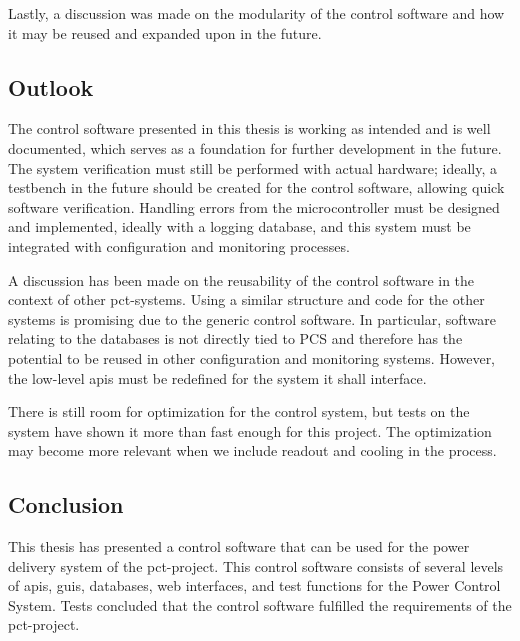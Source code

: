 \documentclass[main.tex]{subfiles}
\begin{document}
Lastly, a discussion was made on the modularity of the control software and how it may be reused and expanded upon in the future.

\subsection{Outlook}
The control software presented in this thesis is working as intended and is well documented, which serves as a foundation for further development in the future. The system verification must still be performed with actual hardware; ideally, a testbench in the future should be created for the control software, allowing quick software verification. Handling errors from the microcontroller must be designed and implemented, ideally with a logging database, and this system must be integrated with configuration and monitoring processes.

A discussion has been made on the reusability of the control software in the context of other \gls{pct}-systems. Using a similar structure and code for the other systems is promising due to the generic control software. In particular, software relating to the databases is not directly tied to PCS and therefore has the potential to be reused in other configuration and monitoring systems. However, the low-level \gls{api}s must be redefined for the system it shall interface. 

There is still room for optimization for the control system, but tests on the system have shown it more than fast enough for this project. The optimization may become more relevant when we include readout and cooling in the process.

\subsection{Conclusion}

This thesis has presented a control software that can be used for the power delivery system of the \gls{pct}-project. This control software consists of several levels of \gls{api}s, \gls{gui}s, databases, web interfaces, and test functions for the Power Control System. Tests concluded that the control software fulfilled the requirements of the \gls{pct}-project.
\end{document}
